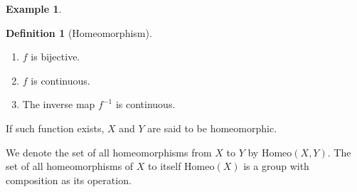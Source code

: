 \documentclass[a4paper]{book}
\theoremstyle{definition}
\newtheorem{definition}{Definition}[chapter]
\newtheorem{example}{Example}[definition]
\begin{document}
\begin{example}
\begin{definition}[Homeomorphism]
        \begin{enumerate}
            \item \(f\) is {\color{mathif}bijective}.
            \item \(f\) is {\color{mathif}continuous}.
            \item The inverse map \(f^{-1}\) is {\color{mathif}continuous}.
        \end{enumerate}

        If such function exists, \(X\) and \(Y\) are said to be {\color{maththen}homeomorphic}.

        We denote the set of all homeomorphisms from \(X\) to \(Y\) by \(\mathrm{Homeo}(X, Y)\). The set of all homeomorphisms of \(X\) to itself \(\mathrm{Homeo}(X)\) is a group with composition as its operation.
    \end{definition}
\end{example}
\end{document}
